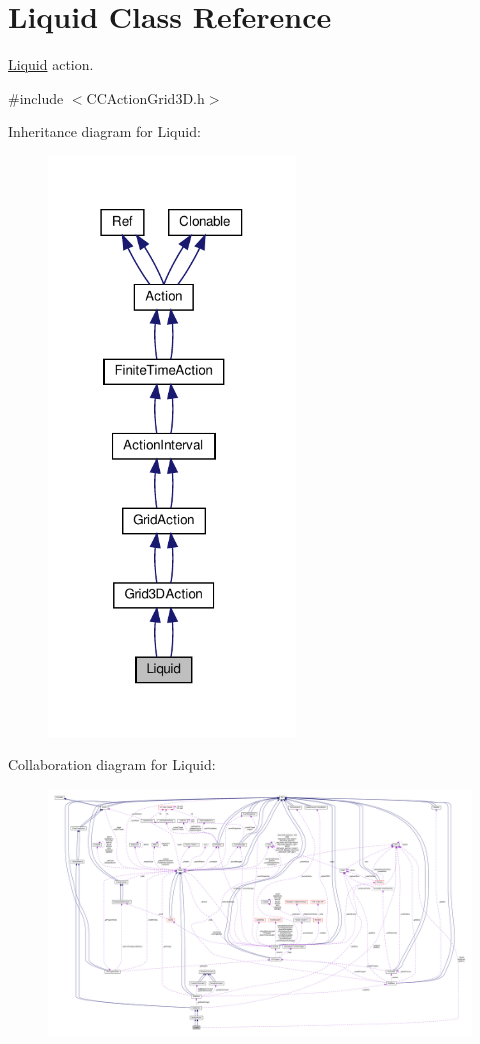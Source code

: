 \hypertarget{classLiquid}{}\section{Liquid Class Reference}
\label{classLiquid}


\hyperlink{classLiquid}{Liquid} action.  




{\ttfamily \#include $<$C\+C\+Action\+Grid3\+D.\+h$>$}



Inheritance diagram for Liquid\+:
\nopagebreak
\begin{figure}[H]
\begin{center}
\leavevmode
\includegraphics[width=186pt]{classLiquid__inherit__graph}
\end{center}
\end{figure}


Collaboration diagram for Liquid\+:
\nopagebreak
\begin{figure}[H]
\begin{center}
\leavevmode
\includegraphics[width=350pt]{classLiquid__coll__graph}
\end{center}
\end{figure}
